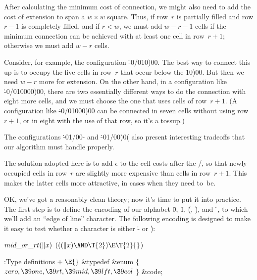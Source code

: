 \fi

After calculating the minimum cost of connection, we might
also need to
add the cost of extension to span a $w\times w$ square. Thus, if row~$r$
is partially filled and row $r-1$ is completely filled, and if $r<w$,
we must add $w-r-1$ cells if the minimum connection can be achieved with at
least one cell in row~$r+1$; otherwise we must add $w-r$ cells.

Consider, for example, the configuration \.{-0\caret/010)00}. The best way
to connect this up is to occupy the five cells in row~$r$ that occur below the
\.{10)00}. But then we need $w-r$ more for extension. On the other hand,
in a configuration like \.{-0\caret/010000)00}, there are two essentially
different ways to do the connection with eight more cells, and we must choose
the one that uses cells of row~$r+1$. (A configuration like
\.{-0\caret/01000)00} can be connected in seven cells without using
row $r+1$, or in eight with the use of that row, so it's a tossup.)

The configurations \.{-01\caret/00-} and \.{-01\caret/00)0(} also
present interesting tradeoffs that our algorithm must handle properly.

The solution adopted here is to add $\epsilon$ to the cell costs after
the \qcaret/, so that newly occupied cells in row~$r$
are slightly more expensive than cells in row~$r+1$. This makes the
latter cells more attractive, in cases when they need to~be.

\fi

OK, we've got a reasonably clean theory; now it's time to
put it into
practice. The first step is to define the encoding of our alphabet
\.0, \.1, \.(, \.), and \.-, to which we'll add an ``edge of line''
character. The following encoding is designed to make it easy to test
whether a character is either \.- or \.):

\Y\B\4\D$\\{mid\_or\_rt}(\|x)$ \5
$(((\|x)\AND\T{2})\E\T{2}{}$)\par
\Y\B\4:Type definitions\X${}\mathrel+\E{}$\6
\&{typedef} \&{enum} ${}\{{}$\1\6
${}\\{zero},\39\\{one},\39\\{rt},\39\\{mid},\39\\{lft},\39\\{eol}{}$\2\6
${}\}{}$ \&{code};\par
\fi

